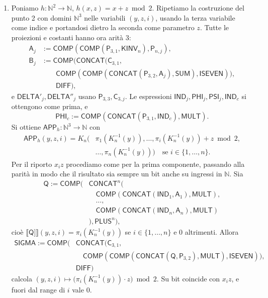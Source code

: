 \begin{sol}
\begin{enumerate}
\[
\mathsf{APP}_{\mathsf{EFFE}}:=\mathsf{COMP}(\mathsf{CONCAT}^{n+1}(\mathsf{PSI}_1,\dots,\mathsf{PSI}_n,\mathsf{PHI}_c),\mathsf{PLUS}^{n+1}).
\]
\item Poniamo $h:\mathbb N^2\to\mathbb N$, $h(x,z)=x+z \bmod 2$. Ripetiamo la costruzione del punto 2 con domini $\mathbb N^3$ nelle variabili $(y,z,i)$, usando la terza variabile come indice e portandosi dietro la seconda come parametro $z$. Tutte le proiezioni e costanti hanno ora arità $3$:
\[
\begin{aligned}
\mathsf A_j&:=\mathsf{COMP}(\mathsf{COMP}(\mathsf P_{3,1},\mathsf{KINV}_n),\mathsf P_{n,j}),\\
\mathsf B_j&:=\mathsf{COMP}\Big(\mathsf{CONCAT}\big(\mathsf C_{3,1},\\
&\qquad\mathsf{COMP}(\mathsf{COMP}(\mathsf{CONCAT}(\mathsf P_{3,2},\mathsf A_j),\mathsf{SUM}),\mathsf{ISEVEN})\big),\\
&\qquad\mathsf{DIFF}\Big),
\end{aligned}
\]
e $\mathsf{DELTA}'_j,\mathsf{DELTA}''_j$ usano $\mathsf P_{3,3},\mathsf C_{3,j}$. Le espressioni $\mathsf{IND}_j,\mathsf{PHI}_j,\mathsf{PSI}_j,\mathsf{IND}_c$ si ottengono come prima, e
\[
\mathsf{PHI}_c:=\mathsf{COMP}(\mathsf{CONCAT}(\mathsf P_{3,1},\mathsf{IND}_c),\mathsf{MULT}).
\]
Si ottiene $\mathsf{APP}_h:\mathbb N^3\to\mathbb N$ con
\[
\begin{aligned}
\mathsf{APP}_h(y,z,i)=K_n\big(&\pi_1(K_n^{-1}(y)),\dots,\pi_i(K_n^{-1}(y))+z \bmod 2,\\
&\dots,\pi_n(K_n^{-1}(y))\big)\quad\text{se }i\in\{1,\dots,n\}.
\end{aligned}
\]
Per il riporto $x_iz$ procediamo come per la prima componente, passando alla parità in modo che il risultato sia sempre un bit anche su ingressi in $\mathbb N$. Sia
\[
\begin{aligned}
\mathsf Q:=\mathsf{COMP}\Big(&\mathsf{CONCAT}^n\big(\\
&\quad\mathsf{COMP}(\mathsf{CONCAT}(\mathsf{IND}_1,\mathsf A_1),\mathsf{MULT}),\\
&\quad\dots,\\
&\quad\mathsf{COMP}(\mathsf{CONCAT}(\mathsf{IND}_n,\mathsf A_n),\mathsf{MULT})\\
&\big),\mathsf{PLUS}^n\Big),
\end{aligned}
\]
cioè $\llbracket\mathsf Q]\rrbracket(y,z,i)=\pi_i(K_n^{-1}(y))$ se $i\in\{1,\dots,n\}$ e $0$ altrimenti. Allora
\[
\begin{aligned}
\mathsf{SIGMA}:=\mathsf{COMP}\Big(&\mathsf{CONCAT}\big(\mathsf C_{3,1},\\
&\quad\mathsf{COMP}(\mathsf{COMP}(\mathsf{CONCAT}(\mathsf Q,\mathsf P_{3,2}),\mathsf{MULT}),\mathsf{ISEVEN})\big),\\
&\mathsf{DIFF}\Big)
\end{aligned}
\]
calcola $(y,z,i)\mapsto\big(\pi_i(K_n^{-1}(y))\cdot z\big)\bmod 2$. Su bit coincide con $x_iz$, e fuori dal range di $i$ vale $0$.


\end{enumerate}
\end{sol}
